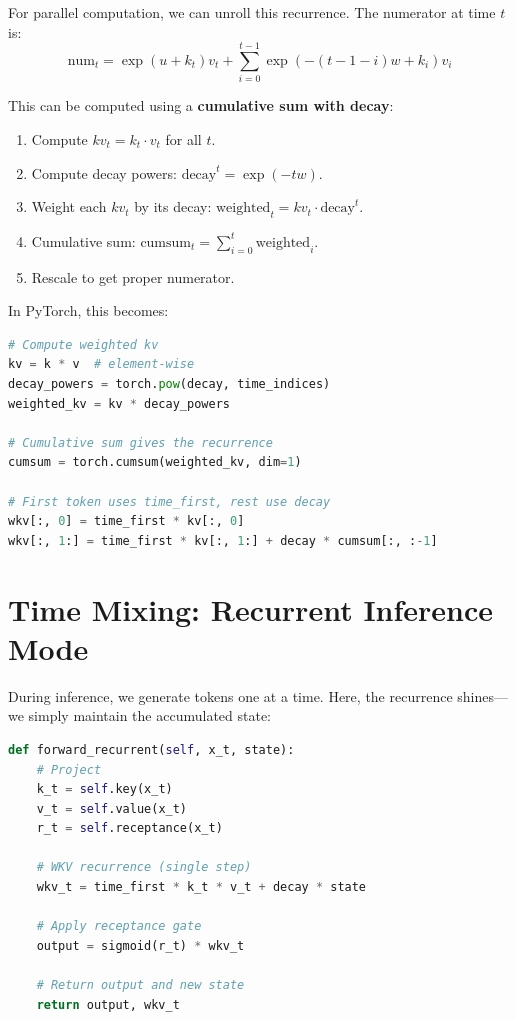 \documentclass[12pt]{article}
\begin{document}
For parallel computation, we can unroll this recurrence. The numerator at time $t$ is:
\begin{equation}
    \text{num}_t = \exp(u + k_t) v_t + \sum_{i=0}^{t-1} \exp(-(t-1-i)w + k_i) v_i
\end{equation}

This can be computed using a \textbf{cumulative sum with decay}:
\begin{enumerate}
    \item Compute $kv_t = k_t \cdot v_t$ for all $t$.
    \item Compute decay powers: $\text{decay}^t = \exp(-tw)$.
    \item Weight each $kv_t$ by its decay: $\text{weighted}_t = kv_t \cdot \text{decay}^t$.
    \item Cumulative sum: $\text{cumsum}_t = \sum_{i=0}^t \text{weighted}_i$.
    \item Rescale to get proper numerator.
\end{enumerate}

In PyTorch, this becomes:
\begin{lstlisting}[language=Python, basicstyle=\small\ttfamily]
# Compute weighted kv
kv = k * v  # element-wise
decay_powers = torch.pow(decay, time_indices)
weighted_kv = kv * decay_powers

# Cumulative sum gives the recurrence
cumsum = torch.cumsum(weighted_kv, dim=1)

# First token uses time_first, rest use decay
wkv[:, 0] = time_first * kv[:, 0]
wkv[:, 1:] = time_first * kv[:, 1:] + decay * cumsum[:, :-1]
\end{lstlisting}

\section*{Time Mixing: Recurrent Inference Mode}

During inference, we generate tokens one at a time. Here, the recurrence shines—we simply maintain the accumulated state:

\begin{lstlisting}[language=Python, basicstyle=\small\ttfamily]
def forward_recurrent(self, x_t, state):
    # Project
    k_t = self.key(x_t)
    v_t = self.value(x_t)
    r_t = self.receptance(x_t)
    
    # WKV recurrence (single step)
    wkv_t = time_first * k_t * v_t + decay * state
    
    # Apply receptance gate
    output = sigmoid(r_t) * wkv_t
    
    # Return output and new state
    return output, wkv_t
\end{lstlisting}
\end{document}
